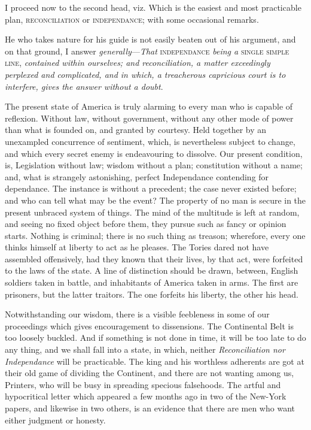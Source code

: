 \documentclass[12pt, twocolumn]{book}
\begin{document}
    I proceed now to the second head, viz. Which is the easiest and most practicable plan, \textsc{reconciliation} or \textsc{independance}; with some occasional remarks.

    He who takes nature for his guide is not easily beaten out of his argument, and on that ground, I answer \textit{generally}—\textit{That} \textsc{independance} \textit{being a} \textsc{single simple line}, \textit{contained within ourselves; and reconciliation, a matter exceedingly perplexed and complicated, and in which, a treacherous capricious court is to interfere, gives the answer without a doubt}.

    The present state of America is truly alarming to every man who is capable of reflexion. Without law, without government, without any other mode of power than what is founded on, and granted by courtesy. Held together by an unexampled concurrence of sentiment, which, is nevertheless subject to change, and which every secret enemy is endeavouring to dissolve. Our present condition, is, Legislation without law; wisdom without a plan; constitution without a name; and, what is strangely astonishing, perfect Independance contending for dependance. The instance is without a precedent; the case never existed before; and who can tell what may be the event? The property of no man is secure in the present unbraced system of things. The mind of the multitude is left at random, and seeing no fixed object before them, they pursue such as fancy or opinion starts. Nothing is criminal; there is no such thing as treason; wherefore, every one thinks himself at liberty to act as he pleases. The Tories dared not have assembled offensively, had they known that their lives, by that act, were forfeited to the laws of the state. A line of distinction should be drawn, between, English soldiers taken in battle, and inhabitants of America taken in arms. The first are prisoners, but the latter traitors. The one forfeits his liberty, the other his head.

    Notwithstanding our wisdom, there is a visible feebleness in some of our proceedings which gives encouragement to dissensions. The Continental Belt is too loosely buckled. And if something is not done in time, it will be too late to do any thing, and we shall fall into a state, in which, neither \textit{Reconciliation nor Independance} will be practicable. The king and his worthless adherents are got at their old game of dividing the Continent, and there are not wanting among us, Printers, who will be busy in spreading specious falsehoods. The artful and hypocritical letter which appeared a few months ago in two of the New-York papers, and likewise in two others, is an evidence that there are men who want either judgment or honesty.
\end{document}
